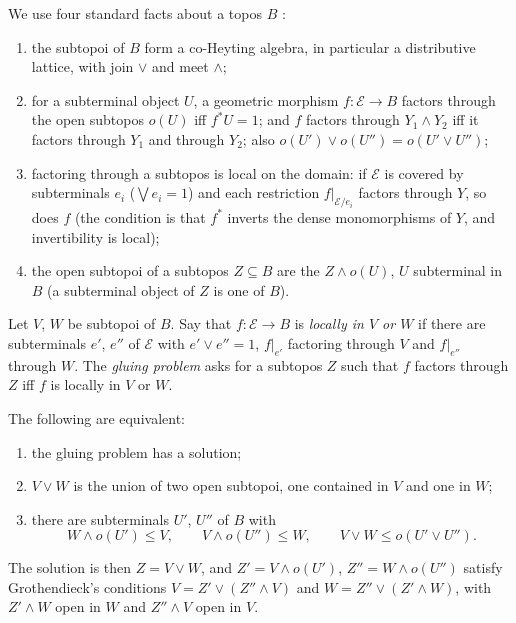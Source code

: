 We use four standard facts about a topos $B$ \cite[\S A4.5]{elephant}:
\begin{enumerate}
\item[(F1)] the subtopoi of $B$ form a co-Heyting algebra, in particular a distributive lattice, with join $\vee$ and meet $\wedge$;
\item[(F2)] for a subterminal object $U$, a geometric morphism $f\colon \mathcal E\to B$ factors through the open subtopos $o(U)$ iff $f^*U = 1$; and $f$ factors through $Y_1\wedge Y_2$ iff it factors through $Y_1$ and through $Y_2$; also $o(U')\vee o(U'') = o(U'\vee U'')$;
\item[(F3)] factoring through a subtopos is local on the domain: if $\mathcal E$ is covered by subterminals $e_i$ ($\bigvee e_i = 1$) and each restriction $f|_{\mathcal E/e_i}$ factors through $Y$, so does $f$ (the condition is that $f^*$ inverts the dense monomorphisms of $Y$, and invertibility is local);
\item[(F4)] the open subtopoi of a subtopos $Z\subseteq B$ are the $Z\wedge o(U)$, $U$ subterminal in $B$ (a subterminal object of $Z$ is one of $B$).
\end{enumerate}
Let $V$, $W$ be subtopoi of $B$. Say that $f\colon\mathcal E\to B$ is \emph{locally in $V$ or $W$} if there are subterminals $e'$, $e''$ of $\mathcal E$ with $e'\vee e'' = 1$, $f|_{e'}$ factoring through $V$ and $f|_{e''}$ through $W$. The \emph{gluing problem} asks for a subtopos $Z$ such that $f$ factors through $Z$ iff $f$ is locally in $V$ or $W$.

\begin{theorem}\label{th:gluing}
The following are equivalent:
\begin{enumerate}
\item the gluing problem has a solution;
\item $V\vee W$ is the union of two open subtopoi, one contained in $V$ and one in $W$;
\item there are subterminals $U'$, $U''$ of $B$ with
\[
W\wedge o(U')\le V,\qquad V\wedge o(U'')\le W,\qquad V\vee W\le o(U'\vee U'').
\]
\end{enumerate}
The solution is then $Z = V\vee W$, and $Z' = V\wedge o(U')$, $Z'' = W\wedge o(U'')$ satisfy Grothendieck's conditions $V = Z'\vee(Z''\wedge V)$ and $W = Z''\vee(Z'\wedge W)$, with $Z'\wedge W$ open in $W$ and $Z''\wedge V$ open in $V$.
\end{theorem}

